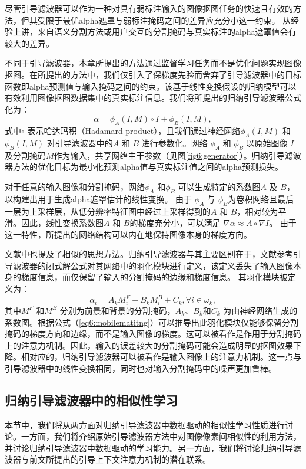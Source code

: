 尽管引导滤波器可以作为一种对具有弱标注输入的图像抠图任务的快速且有效的方法，但其受限于最优alpha遮罩与弱标注掩码之间的差异应充分小这一约束。 从经验上讲，来自语义分割方法或用户交互的分割掩码与真实标注的alpha遮罩值会有较大的差异。

不同于引导滤波器，本章所提出的方法通过监督学习任务而不是优化问题实现图像抠图。在所提出的方法中，我们仅引入了保梯度先验而舍弃了引导滤波器中的目标函数即alpha预测值与输入掩码之间的约束。该基于线性变换假设的归纳模型可以有效利用图像抠图数据集中的真实标注信息。我们将所提出的归纳引导滤波器公式化为：
\begin{equation}
\alpha = \phi_{A}(I, M)\circ I + \phi_{B}(I, M), 
\label{eq6:igf}
\end{equation}
式中$ \circ $ 表示哈达玛积（Hadamard product），且我们通过神经网络$ \phi_{A}(I, M) $ 和 $ \phi_{B}(I, M) $ 对引导滤波器中的$ A $ 和 $ B $ 进行参数化。网络 $ \phi_{A} $ 和 $ \phi_{B} $ 以原始图像 $ I $ 及分割掩码$ M $作为输入，共享网络主干参数（见图\ref{fig6:generator}）。归纳引导滤波器方法的优化目标为最小化预测alpha值与真实标注值之间的alpha预测损失。

对于任意的输入图像和分割掩码，网络$ \phi_{A} $ 和$ \phi_{B} $ 可以生成特定的系数图$ A $ 及 $ B $，以构建出用于生成alpha遮罩估计的线性变换。 
由于 $ \phi_{A} $ 与 $ \phi_{B} $为卷积网络且最后一层为上采样层，从低分辨率特征图中经过上采样得到的$ A $ 和 $ B $，相对较为平滑。因此，线性变换系数图$ A $ 和 $ B $的梯度充分小，可以满足 $ \nabla \alpha \approx A \circ \nabla I $。
由于这一特性，所提出的网络结构可以内在地保持图像本身的梯度方向。

文献\parencite{zhu2017fast}中也提及了相似的思想方法。归纳引导滤波器与其主要区别在于，文献\parencite{zhu2017fast}参考引导滤波器的闭式解公式对其网络中的羽化模块进行定义，该定义丢失了输入图像本身的梯度信息，而仅保留了输入的分割掩码的边缘和梯度信息。
其羽化模块被定义为：
\begin{equation}
\alpha_i = A_k M^F_i + B_k M^B_i + C_k, \forall i \in \omega_k,
\label{eq6:mobilematitng}
\end{equation}
其中$ M^F $ 和$M^B$ 分别为前景和背景的分割掩码，$ A_k$、$B_k $和$ C_k $ 为由神经网络生成的系数图。根据公式（\ref{eq6:mobilematitng}）可以推导出此羽化模块仅能够保留分割掩码的梯度方向和边缘，而不是输入图像的梯度。这可以被看作是作用于分割掩码上的注意力机制。因此，输入的误差较大的分割掩码可能会造成明显的抠图效果下降。相对应的，归纳引导滤波器可以被看作是输入图像上的注意力机制。这一点与引导滤波器中的线性变换相同，同时也对输入分割掩码中的噪声更加鲁棒。

\subsection{归纳引导滤波器中的相似性学习}
本节中，我们将从两方面对归纳引导滤波器中数据驱动的相似性学习性质进行讨论。一方面，我们将介绍原始引导滤波器方法中对图像像素间相似性的利用方法，并讨论归纳引导滤波器中数据驱动的学习能力。另一方面，我们将讨论归纳引导滤波器与前文所提出的引导上下文注意力机制的潜在联系。

